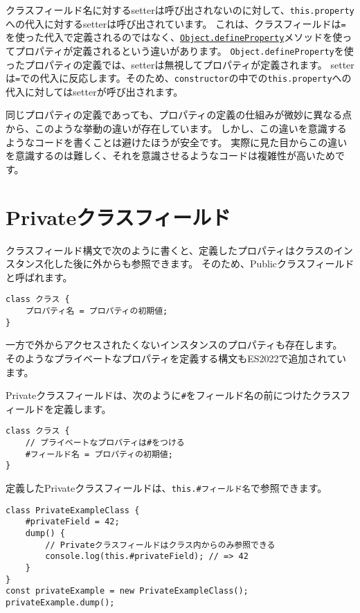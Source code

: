 \begin{tcolorbox}[enhanced jigsaw,breakable,title=クラスフィールドとインスタンスのプロパティの違い]
クラスフィールド名に対するsetterは呼び出されないのに対して、\texttt{this.property}への代入に対するsetterは呼び出されています。
これは、クラスフィールドは\texttt{=}を使った代入で定義されるのではなく、\href{https://developer.mozilla.org/ja/docs/Web/JavaScript/Reference/Global_Objects/Object/defineProperty}{\texttt{Object.defineProperty}}メソッドを使ってプロパティが定義されるという違いがあります。
\texttt{Object.defineProperty}を使ったプロパティの定義では、setterは無視してプロパティが定義されます。
setterは\texttt{=}での代入に反応します。そのため、\texttt{constructor}の中での\texttt{this.property}への代入に対してはsetterが呼び出されます。

同じプロパティの定義であっても、プロパティの定義の仕組みが微妙に異なる点から、このような挙動の違いが存在しています。
しかし、この違いを意識するようなコードを書くことは避けたほうが安全です。
実際に見た目からこの違いを意識するのは難しく、それを意識させるようなコードは複雑性が高いためです。
\end{tcolorbox}

\hypertarget{private-class-fields}{%
\section{Privateクラスフィールド\,\protect{}}\label{private-class-fields}}

クラスフィールド構文で次のように書くと、定義したプロパティはクラスのインスタンス化した後に外からも参照できます。
そのため、Publicクラスフィールドと呼ばれます。

\begin{lstlisting}
class クラス {
    プロパティ名 = プロパティの初期値;
}
\end{lstlisting}

一方で外からアクセスされたくないインスタンスのプロパティも存在します。
そのようなプライベートなプロパティを定義する構文もES2022で追加されています。

Privateクラスフィールドは、次のように\texttt{\#}をフィールド名の前につけたクラスフィールドを定義します。

\begin{lstlisting}
class クラス {
    // プライベートなプロパティは#をつける
    #フィールド名 = プロパティの初期値;
}
\end{lstlisting}

定義したPrivateクラスフィールドは、\texttt{this.\#フィールド名}で参照できます。

\begin{lstlisting}
class PrivateExampleClass {
    #privateField = 42;
    dump() {
        // Privateクラスフィールドはクラス内からのみ参照できる
        console.log(this.#privateField); // => 42
    }
}
const privateExample = new PrivateExampleClass();
privateExample.dump();
\end{lstlisting}

